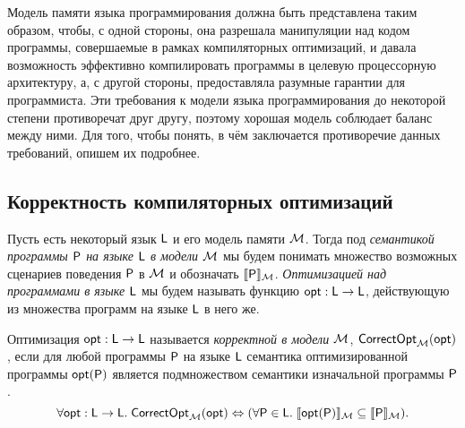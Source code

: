 Модель памяти языка программирования должна быть представлена таким образом, чтобы, с одной стороны,
она разрешала манипуляции над кодом программы, совершаемые в рамках компиляторных оптимизаций, и давала возможность
эффективно компилировать программы в целевую процессорную архитектуру, а, с другой стороны, предоставляла
разумные гарантии для программиста.
Эти требования к модели языка программирования до некоторой степени противоречат друг другу, поэтому хорошая модель
соблюдает баланс между ними.
Для того, чтобы понять, в чём заключается противоречие данных требований, опишем их подробнее.

\subsection{Корректность компиляторных оптимизаций}
Пусть есть некоторый язык $\mathsf{L}$ и его модель памяти $\mathcal{M}$. Тогда под \emph{семантикой программы $\mathsf{P}$ на языке $\mathsf{L}$ в модели $\mathcal{M}$}
мы будем понимать множество возможных сценариев поведения $\mathsf{P}$ в $\mathcal{M}$ и обозначать $\llbracket \mathsf{P} \rrbracket_{\mathcal{M}}$.
\emph{Оптимизацией над программами в языке $\mathsf{L}$} мы будем называть функцию $\mathsf{opt} : \mathsf{L} \rightarrow \mathsf{L}$, действующую из
множества программ на языке $\mathsf{L}$ в него же.
\begin{definition}
  Оптимизация $\mathsf{opt} : \mathsf{L} \rightarrow \mathsf{L}$ называется \emph{корректной в модели $\mathcal{M}$},
  $\mathsf{CorrectOpt}_{\mathcal{M}}(\mathsf{opt})$, если для любой программы $\mathsf{P}$ на языке $\mathsf{L}$
  семантика оптимизированной программы $\mathsf{opt}(\mathsf{P})$ является подмножеством семантики изначальной программы $\mathsf{P}$.
  \[\forall \mathsf{opt} : \mathsf{L} \rightarrow \mathsf{L}. \; \mathsf{CorrectOpt}_{\mathcal{M}}(\mathsf{opt}) \Leftrightarrow (\forall \mathsf{P} \in \mathsf{L}. \; \llbracket \mathsf{opt}(\mathsf{P}) \rrbracket_{\mathcal{M}} \subseteq \llbracket \mathsf{P} \rrbracket_{\mathcal{M}}). \]
\end{definition}

